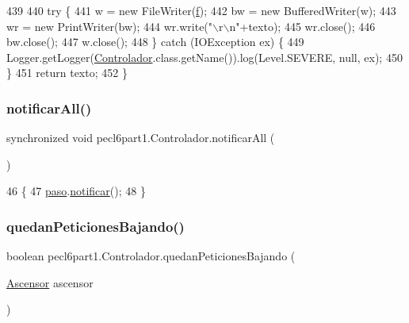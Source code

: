 \begin{DoxyCode}
439         
440         \textcolor{keywordflow}{try} \{
441             w = \textcolor{keyword}{new} FileWriter(\mbox{\hyperlink{classpecl6part1_1_1_controlador_a105bb0bb218c9e351cc76ddcb259a426}{f}});
442             bw = \textcolor{keyword}{new} BufferedWriter(w);
443             wr = \textcolor{keyword}{new} PrintWriter(bw);
444             wr.write(\textcolor{stringliteral}{"\(\backslash\)r\(\backslash\)n"}+texto);
445             wr.close();
446             bw.close();
447             w.close();
448         \} \textcolor{keywordflow}{catch} (IOException ex) \{
449             Logger.getLogger(\mbox{\hyperlink{classpecl6part1_1_1_controlador}{Controlador}}.class.getName()).log(Level.SEVERE, null, ex);
450         \}
451         \textcolor{keywordflow}{return} texto;
452     \}
\end{DoxyCode}
\mbox{\label{classpecl6part1_1_1_controlador_ae0f488e5a6c01ceb3afbd15cc924c8ab}} 
\subsubsection{\texorpdfstring{notificar\+All()}{notificarAll()}}
{\footnotesize\ttfamily synchronized void pecl6part1.\+Controlador.\+notificar\+All (\begin{DoxyParamCaption}{ }\end{DoxyParamCaption})\hspace{0.3cm}{\ttfamily [inline]}}


\begin{DoxyCode}
46     \{
47         \mbox{\hyperlink{classpecl6part1_1_1_controlador_af51f3a80f264d4175c0381f8b5e8edc0}{paso}}.\mbox{\hyperlink{classpecl6part1_1_1_monitor_a0d517f29c1d3a1bcc10a0fc80283a342}{notificar}}();
48     \}
\end{DoxyCode}
\mbox{\label{classpecl6part1_1_1_controlador_ae0f86b8248c267efc70501c7feb465b2}} 
\subsubsection{\texorpdfstring{quedan\+Peticiones\+Bajando()}{quedanPeticionesBajando()}}
{\footnotesize\ttfamily boolean pecl6part1.\+Controlador.\+quedan\+Peticiones\+Bajando (\begin{DoxyParamCaption}\item[{\mbox{\hyperlink{classpecl6part1_1_1_ascensor}{Ascensor}}}]{ascensor }\end{DoxyParamCaption})\hspace{0.3cm}{\ttfamily [inline]}}


